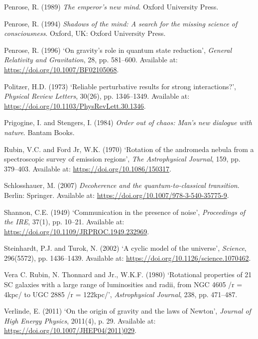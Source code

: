 \documentclass[
]{article}
\newlength{\cslhangindent}
\newenvironment{CSLReferences}[2] %
 {\begin{list}{}{%
  \setlength{\itemindent}{0pt}
  \setlength{\leftmargin}{0pt}
  \setlength{\parsep}{0pt}
  \ifodd #1
   \setlength{\leftmargin}{\cslhangindent}
   \setlength{\itemindent}{-1\cslhangindent}
  \fi
  \setlength{\itemsep}{#2\baselineskip}}}
 {\end{list}}
\begin{document}
\begin{CSLReferences}{0}{1}
Penrose, R. (1989) \emph{The emperor's new mind}. Oxford University
Press.

Penrose, R. (1994) \emph{Shadows of the mind: A search for the missing
science of consciousness}. Oxford, UK: Oxford University Press.

Penrose, R. (1996) {`On gravity's role in quantum state reduction'},
\emph{General Relativity and Gravitation}, 28, pp. 581--600. Available
at: \url{https://doi.org/10.1007/BF02105068}.

Politzer, H.D. (1973) {`Reliable perturbative results for strong
interactions?'}, \emph{Physical Review Letters}, 30(26), pp. 1346--1349.
Available at: \url{https://doi.org/10.1103/PhysRevLett.30.1346}.

Prigogine, I. and Stengers, I. (1984) \emph{Order out of chaos: Man's
new dialogue with nature}. Bantam Books.

Rubin, V.C. and Ford Jr, W.K. (1970) {`Rotation of the andromeda nebula
from a spectroscopic survey of emission regions'}, \emph{The
Astrophysical Journal}, 159, pp. 379--403. Available at:
\url{https://doi.org/10.1086/150317}.

Schlosshauer, M. (2007) \emph{Decoherence and the quantum-to-classical
transition}. Berlin: Springer. Available at:
\url{https://doi.org/10.1007/978-3-540-35775-9}.

Shannon, C.E. (1949) {`Communication in the presence of noise'},
\emph{Proceedings of the IRE}, 37(1), pp. 10--21. Available at:
\url{https://doi.org/10.1109/JRPROC.1949.232969}.

Steinhardt, P.J. and Turok, N. (2002) {`A cyclic model of the
universe'}, \emph{Science}, 296(5572), pp. 1436--1439. Available at:
\url{https://doi.org/10.1126/science.1070462}.

Vera C. Rubin, N. Thonnard and Jr., W.K.F. (1980) {`Rotational
properties of 21 SC galaxies with a large range of luminosities and
radii, from NGC 4605 /r = 4kpc/ to UGC 2885 /r = 122kpc/'},
\emph{Astrophysical Journal}, 238, pp. 471--487.

Verlinde, E. (2011) {`On the origin of gravity and the laws of
{Newton}'}, \emph{Journal of High Energy Physics}, 2011(4), p. 29.
Available at: \url{https://doi.org/10.1007/JHEP04(2011)029}.


\end{CSLReferences}
\end{document}
